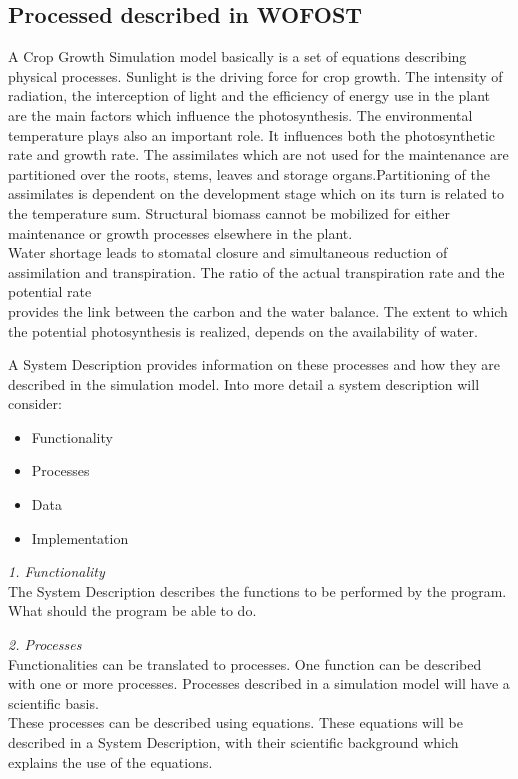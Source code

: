 \subsection{Processed described in WOFOST}
A Crop Growth Simulation model basically is a set of equations describing physical
processes. Sunlight is the driving force for crop growth. The intensity of radiation, the
interception of light and the efficiency of energy use in the plant are the main factors
which influ\-ence the photosynthesis. The environmental temperature plays also an
important role. It influences both the photosynthetic rate and growth rate. The
assimilates which are not used for the maintenance are partitioned over the roots,
stems, leaves and storage organs.Partitioning of the assimilates is dependent on the
development stage which on its turn is related to the temperature sum. Structural
biomass cannot be mobilized for either maintenance or growth processes elsewhere in
the plant.\\
Water shortage leads to stomatal closure and simultaneous reduction of assimilation
and transpiration. The ratio of the actual transpiration rate and the potential rate\\
provides the link between the carbon and the water balance. The extent to which the
potential photosynthesis is realized, depends on the availability of water.

A System Description provides information on these processes and how they are
described in the simulation model. Into more detail a system description will 
consider:
\begin{itemize}
\item Functionality
\item Processes
\item Data
\item Implementation
\end{itemize}

{\it 1. Functionality\/}\\
The System Description describes the functions to be performed by the program.
What should the program be able to do. 

{\it 2. Processes\/}\\
Functionalities can be translated to processes. One function can be described with
one or more processes. Processes described in a simulation model will have a
scientific basis.\\
These processes can be described using equations. These equations will be described
in a System Description, with their scientific background which explains the use of the
equations. 

